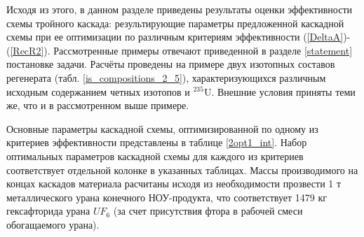 {Исходя из этого, в данном разделе приведены результаты оценки эффективности схемы тройного каскада: результирующие параметры предложенной каскадной схемы при ее оптимизации по различным критериям эффективности (\ref{DeltaA})-(\ref{RecR2}). Рассмотренные примеры отвечают приведенной в разделе \ref{statement} постановке задачи. Расчёты проведены на примере двух изотопных составов регенерата (табл. \ref{is_compositions_2_5}), характеризующихся различным исходным содержанием четных изотопов и $^{235}$U. Внешние условия приняты теми же, что и в рассмотренном выше примере. 

Основные параметры каскадной схемы, оптимизированной по одному из критериев эффективности представлены в таблице \ref{2opt1_int}.
Набор оптимальных параметров каскадной схемы для каждого из критериев соответствует отдельной колонке в указанных таблицах. 
Массы производимого на концах каскадов материала расчитаны исходя из необходимости прозвести 1 т металлического урана конечного НОУ-продукта, что соответствует 1479 кг гексафторида урана $UF_6$ (за счет присутствия фтора в рабочей смеси обогащаемого урана).

}
